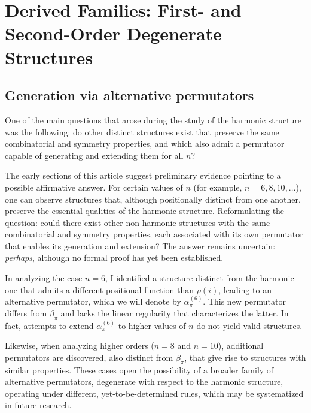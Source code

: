 \documentclass{article}
\begin{document}
\section{Derived Families: First- and Second-Order Degenerate Structures}

\subsection{Generation via alternative permutators}

One of the main questions that arose during the study of the harmonic structure was the following: do other distinct structures exist that preserve the same combinatorial and symmetry properties, and which also admit a permutator capable of generating and extending them for all \(n\)?

\medskip

The early sections of this article suggest preliminary evidence pointing to a possible affirmative answer. For certain values of \(n\) (for example, \(n = 6, 8, 10, \ldots\)), one can observe structures that, although positionally distinct from one another, preserve the essential qualities of the harmonic structure. Reformulating the question: could there exist other non-harmonic structures with the same combinatorial and symmetry properties, each associated with its own permutator that enables its generation and extension? The answer remains uncertain: \emph{perhaps}, although no formal proof has yet been established.

\medskip

In analyzing the case \(n = 6\), I identified a structure distinct from the harmonic one that admits a different positional function than \(\rho(i)\), leading to an alternative permutator, which we will denote by \(\alpha_\pi^{(6)}\). This new permutator differs from \(\beta_\pi\) and lacks the linear regularity that characterizes the latter. In fact, attempts to extend \(\alpha_\pi^{(6)}\) to higher values of \(n\) do not yield valid structures.

\medskip

Likewise, when analyzing higher orders (\(n = 8\) and \(n = 10\)), additional permutators are discovered, also distinct from \(\beta_\pi\), that give rise to structures with similar properties. These cases open the possibility of a broader family of alternative permutators, degenerate with respect to the harmonic structure, operating under different, yet-to-be-determined rules, which may be systematized in future research.
\end{document}
